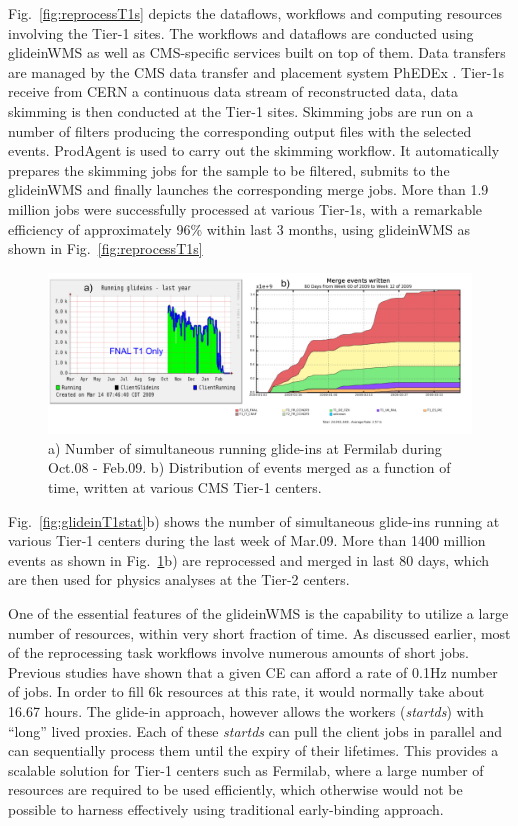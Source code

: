 \documentclass[a4paper]{jpconf}
\begin{document}
Fig.~\ref{fig:reprocessT1s} depicts the dataflows, workflows and computing resources involving the Tier-1 sites.
The workflows and dataflows are conducted using glideinWMS  as well as CMS-specific services 
built on top of them. Data transfers are managed by the CMS data transfer and placement 
system PhEDEx \cite{bib:cms_phedex}. Tier-1s receive from CERN a continuous data stream of reconstructed data, data skimming 
is then conducted at the Tier-1 sites. Skimming jobs are run on a number of filters producing the 
corresponding output files with the selected events. ProdAgent is used to carry out the skimming workflow. 
It automatically prepares the skimming jobs for the sample to be filtered, submits to the glideinWMS and finally
launches the corresponding merge jobs. More than 1.9 million jobs were successfully processed at various 
Tier-1s, with a remarkable efficiency of approximately 96\% within last 3 months, using glideinWMS as shown 
in Fig.~\ref{fig:reprocessT1s}
\begin{figure}
\begin{center}
\includegraphics[scale=0.55]{merged_events}
\end{center}
\caption{a) Number of simultaneous running glide-ins at Fermilab during Oct.08 - Feb.09. b) Distribution of 
events merged as a function of time, written at various CMS Tier-1 centers.}
\label{fig:merged_events}
\end{figure}
Fig.~\ref{fig:glideinT1stat}b) shows the number of simultaneous glide-ins running at various Tier-1 centers during the last week of Mar.09. 
More than 1400 million events as shown in Fig.~\ref{fig:merged_events}b) are reprocessed and merged in last 80 days, which are then 
used for physics analyses at the Tier-2 centers. 

One of the essential features of the glideinWMS is the capability to utilize a large number of
resources, within very short fraction of time. As discussed earlier, most of the reprocessing task 
workflows involve numerous amounts of short jobs. Previous studies have shown that a given CE can 
afford a rate of 0.1Hz number of jobs. In order to fill 6k resources at this rate, it would normally take 
about 16.67 hours.  The glide-in approach, however allows the workers (\emph{startds}) with ``long'' lived proxies. 
Each of these \emph{startds} can pull the client jobs in parallel and can sequentially process them until 
the expiry of their lifetimes. This provides a scalable solution for Tier-1 centers such as Fermilab, 
where a large number of resources are required to be used efficiently, which otherwise would not 
be possible to harness effectively using traditional early-binding approach.
\end{document}

